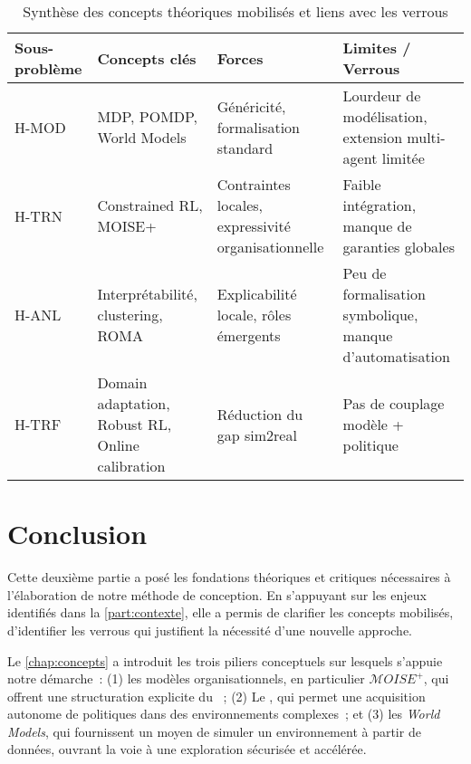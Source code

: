 \begin{table}[h!]
  \centering
  \caption{Synthèse des concepts théoriques mobilisés et liens avec les verrous}
  \label{tab:concepts_synthese}
  \begin{tabular}{|p{3cm}|p{3cm}|p{3cm}|p{5cm}|}
    \hline
    \textbf{Sous-problème} & \textbf{Concepts clés}                           & \textbf{Forces}                                     & \textbf{Limites / Verrous}                               \\
    \hline
    H-MOD                  & MDP, POMDP, World Models                         & Généricité, formalisation standard                  & Lourdeur de modélisation, extension multi-agent limitée  \\
    \hline
    H-TRN                  & Constrained RL, MOISE+                           & Contraintes locales, expressivité organisationnelle & Faible intégration, manque de garanties globales         \\
    \hline
    H-ANL                  & Interprétabilité, clustering, ROMA               & Explicabilité locale, rôles émergents               & Peu de formalisation symbolique, manque d’automatisation \\
    \hline
    H-TRF                  & Domain adaptation, Robust RL, Online calibration & Réduction du gap sim2real                           & Pas de couplage modèle + politique                       \\
    \hline
  \end{tabular}
\end{table}


\clearpage
\thispagestyle{empty}
\null
\newpage


\chapter*{Conclusion}

\noindent
Cette deuxième partie a posé les fondations théoriques et critiques nécessaires à l'élaboration de notre méthode de conception. En s'appuyant sur les enjeux identifiés dans la \autoref{part:contexte}, elle a permis de clarifier les concepts mobilisés, d'identifier les verrous qui justifient la nécessité d'une nouvelle approche.

\medskip

\noindent
Le \autoref{chap:concepts} a introduit les trois piliers conceptuels sur lesquels s'appuie notre démarche~: (1) les modèles organisationnels, en particulier \textit{$\mathcal{M}OISE^+$}, qui offrent une structuration explicite du ~; (2) Le , qui permet une acquisition autonome de politiques dans des environnements complexes~; et (3) les \textit{World Models}, qui fournissent un moyen de simuler un environnement à partir de données, ouvrant la voie à une exploration sécurisée et accélérée.

